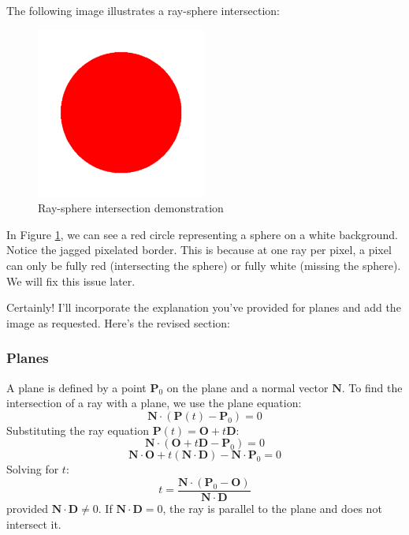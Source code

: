 \documentclass[12pt]{article}
\begin{document}
The following image illustrates a ray-sphere intersection:

\begin{figure}[H]
    \centering
    \includegraphics[width=0.5\textwidth]{images/ray_sphere_intersection.png}
    \caption{Ray-sphere intersection demonstration}
    \label{fig:raysphereintersection}
\end{figure}

In Figure \ref{fig:raysphereintersection}, we can see a red circle representing a sphere on a white background. Notice the jagged pixelated border. This is because at one ray per pixel, a pixel can only be fully red (intersecting the sphere) or fully white (missing the sphere). We will fix this issue later.

Certainly! I'll incorporate the explanation you've provided for planes and add the image as requested. Here's the revised section:

\subsubsection{Planes}

A plane is defined by a point \(\mathbf{P}_0\) on the plane and a normal vector \(\mathbf{N}\). To find the intersection of a ray with a plane, we use the plane equation:
\[
    \mathbf{N} \cdot \left( \mathbf{P}(t) - \mathbf{P}_0 \right) = 0
\]
Substituting the ray equation \(\mathbf{P}(t) = \mathbf{O} + t\mathbf{D}\):
\[
    \mathbf{N} \cdot \left( \mathbf{O} + t\mathbf{D} - \mathbf{P}_0 \right) = 0
\]
\[
    \mathbf{N} \cdot \mathbf{O} + t \left( \mathbf{N} \cdot \mathbf{D} \right) - \mathbf{N} \cdot \mathbf{P}_0 = 0
\]
Solving for \(t\):
\[
    t = \frac{\mathbf{N} \cdot (\mathbf{P}_0 - \mathbf{O})}{\mathbf{N} \cdot \mathbf{D}}
\]
provided \(\mathbf{N} \cdot \mathbf{D} \neq 0\). If \(\mathbf{N} \cdot \mathbf{D} = 0\), the ray is parallel to the plane and does not intersect it.
\end{document}
